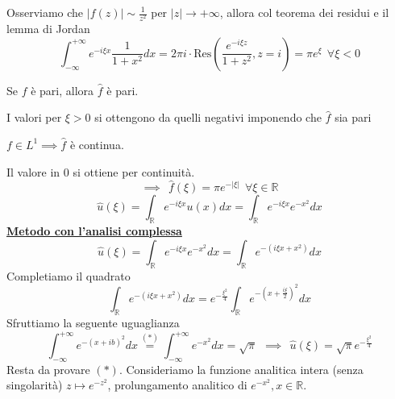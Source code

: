 Osserviamo che $| f( z)| \sim \frac{1}{z^{2}}$ per $| z| \rightarrow +\infty $, allora col teorema dei residui e il lemma di Jordan
\begin{equation*}
\int ^{+\infty }_{-\infty } e^{-i\xi x}\frac{1}{1+x^{2}} dx=2\pi i\cdotp \mathrm{Res}\left(\frac{e^{-i\xi z}}{1+z^{2}} ,z=i\right) =\pi e^{\xi } \ \ \forall \xi < 0
\end{equation*}
\begin{rem}
Se $f$ è pari, allora $\hat{f}$ è pari.
\end{rem}
I valori per $\xi  >0$ si ottengono da quelli negativi imponendo che $\hat{f}$ sia pari
\begin{rem}
$f\in L^{1} \implies \hat{f}$ è continua.
\end{rem}
Il valore in $0$ si ottiene per continuità.
\begin{equation*}
\implies \ \ \boxed{\hat{f}( \xi ) =\pi e^{-| \xi | } \ \ \forall \xi \in \mathbb{R}}
\end{equation*}
\Soluzione
\begin{equation*}
\hat{u}( \xi ) =\int _{\mathbb{R}} e^{-i\xi x} u( x) dx=\int _{\mathbb{R}} e^{-i\xi x} e^{-x^{2}} dx
\end{equation*}
\textbf{\underline{Metodo con l'analisi complessa}}
\begin{equation*}
\hat{u}( \xi ) =\int _{\mathbb{R}} e^{-i\xi x} e^{-x^{2}} dx=\int _{\mathbb{R}} e^{-\left( i\xi x+x^{2}\right)} dx
\end{equation*}
Completiamo il quadrato
\begin{equation*}
\int _{\mathbb{R}} e^{-\left( i\xi x+x^{2}\right)} dx=e^{-\frac{\xi ^{2}}{4}}\int _{\mathbb{R}} e^{-\left( x+\frac{i\xi }{2}\right)^{2}} dx
\end{equation*}
Sfruttiamo la seguente uguaglianza
\begin{equation*}
\int ^{+\infty }_{-\infty } e^{-( x+ib)^{2}} dx\overset{( *)}{=}\int ^{+\infty }_{-\infty } e^{-x^{2}} dx=\sqrt{\pi } \ \ \implies \ \ \boxed{\hat{u}( \xi ) =\sqrt{\pi } e^{-\frac{\xi ^{2}}{4}}}
\end{equation*}
Resta da provare $( *)$. Consideriamo la funzione analitica intera (senza singolarità) $z\mapsto e^{-z^{2}}$, prolungamento analitico di $e^{-x^{2}} ,x\in \mathbb{R}$.


